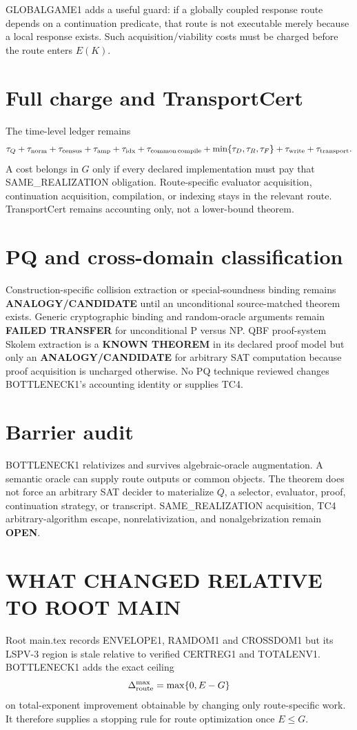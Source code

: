 \documentclass[11pt]{article}
\begin{document}
GLOBALGAME1 adds a useful guard: if a globally coupled response route depends on a continuation predicate, that route is not executable merely because a local response exists. Such acquisition/viability costs must be charged before the route enters \(E(K)\).

\section*{Full charge and TransportCert}
The time-level ledger remains
\[
\tau_Q+\tau_{\rm norm}+\tau_{\rm census}+\tau_{\rm amp}+\tau_{\rm idx}
+\tau_{\rm common\,compile}+\min\{\tau_D,\tau_R,\tau_F\}
+\tau_{\rm write}+\tau_{\rm transport}.
\]
A cost belongs in \(G\) only if every declared implementation must pay that SAME\_REALIZATION obligation. Route-specific evaluator acquisition, continuation acquisition, compilation, or indexing stays in the relevant route. TransportCert remains accounting only, not a lower-bound theorem.

\section*{PQ and cross-domain classification}
Construction-specific collision extraction or special-soundness binding remains \textbf{ANALOGY/CANDIDATE} until an unconditional source-matched theorem exists. Generic cryptographic binding and random-oracle arguments remain \textbf{FAILED TRANSFER} for unconditional P versus NP. QBF proof-system Skolem extraction is a \textbf{KNOWN THEOREM} in its declared proof model but only an \textbf{ANALOGY/CANDIDATE} for arbitrary SAT computation because proof acquisition is uncharged otherwise. No PQ technique reviewed changes BOTTLENECK1's accounting identity or supplies TC4.

\section*{Barrier audit}
BOTTLENECK1 relativizes and survives algebraic-oracle augmentation. A semantic oracle can supply route outputs or common objects. The theorem does not force an arbitrary SAT decider to materialize \(Q\), a selector, evaluator, proof, continuation strategy, or transcript. SAME\_REALIZATION acquisition, TC4 arbitrary-algorithm escape, nonrelativization, and nonalgebrization remain \textbf{OPEN}.

\section*{WHAT CHANGED RELATIVE TO ROOT MAIN}
Root main.tex records ENVELOPE1, RAMDOM1 and CROSSDOM1 but its LSPV-3 region is stale relative to verified CERTREG1 and TOTALENV1. BOTTLENECK1 adds the exact ceiling
\[
\Delta_{\rm route}^{\max}=\max\{0,E-G\}
\]
on total-exponent improvement obtainable by changing only route-specific work. It therefore supplies a stopping rule for route optimization once \(E\le G\).
\end{document}
